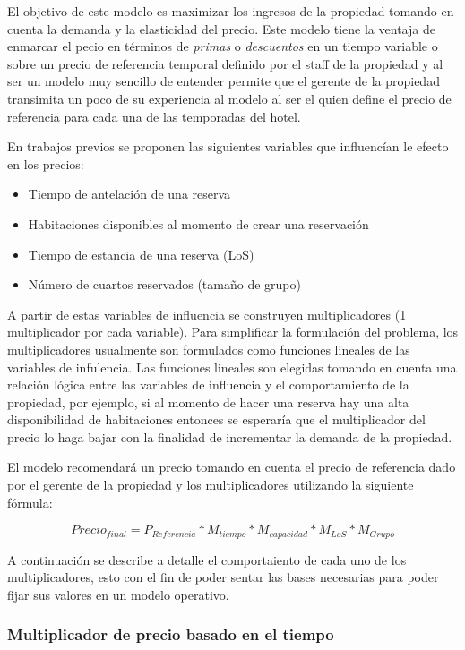 {El objetivo de este modelo es maximizar los ingresos de la propiedad tomando en cuenta la demanda y la elasticidad del precio. Este modelo tiene la ventaja de enmarcar el pecio en términos de \emph{primas} o \emph{descuentos} en un tiempo variable o sobre un precio de referencia temporal definido por el staff de la propiedad y al ser un modelo muy sencillo de entender permite que el gerente de la propiedad transimita un poco de su experiencia al modelo al ser el quien define el precio de referencia para cada una de las temporadas del hotel.

En trabajos previos se proponen las siguientes variables que influencían le efecto en los precios:
\begin{itemize}
  \item Tiempo de antelación de una reserva
  \item Habitaciones disponibles al momento de crear una reservación
  \item Tiempo de estancia de una reserva (LoS)
  \item Número de cuartos reservados (tamaño de grupo)
\end{itemize}

A partir de estas variables de influencia se construyen multiplicadores (1 multiplicador por cada variable). Para simplificar la formulación del problema, los multiplicadores usualmente son formulados como funciones lineales de las variables de infulencia. Las funciones lineales son elegidas tomando en cuenta una relación lógica entre las variables de influencia y el comportamiento de la propiedad, por ejemplo, si al momento de hacer una reserva hay una alta disponibilidad de habitaciones entonces se esperaría que el multiplicador del precio lo haga bajar con la finalidad de incrementar la demanda de la propiedad.

El modelo recomendará un precio tomando en cuenta el precio de referencia dado por el gerente de la propiedad y los multiplicadores utilizando la siguiente fórmula:

$$Precio_{final} = P_{Referencia} * M_{tiempo} * M_{capacidad} * M_{LoS} * M_{Grupo}$$

A continuación se describe a detalle el comportaiento de cada uno de los multiplicadores, esto con el fin de poder sentar las bases necesarias para poder fijar sus valores en un modelo operativo.

\subsubsection*{Multiplicador de precio basado en el tiempo}

}
